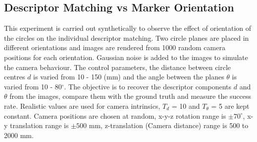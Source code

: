\documentclass{bmvc2k}
\begin{document}
\subsection{Descriptor Matching vs Marker Orientation}
This experiment is carried out synthetically to observe the effect of orientation of the circles on the individual descriptor matching.
Two circle planes are placed in different orientations and images are rendered from 1000 random camera positions for each orientation. Gaussian noise is added to the images to simulate the camera behaviour. 
The control parameters, the distance between circle centres $ d $ is varied from 10 - 150 (mm) and the angle between the planes $ \theta $ is varied from 10 - 80$ ^\circ $. 
The objective is to recover the descriptor components $ d $ and $ \theta $ from the images, compare them with the ground truth and measure the success rate. 
Realistic values are used for camera intrinsics, $ T_{d} $ = 10 and $ T_\theta $ = 5 are kept constant. 
Camera positions are chosen at random, x-y-z rotation range is $ \pm 70^\circ $, x-y translation range is $ \pm 500 $ mm, z-translation (Camera distance) range is 500 to 2000 mm. 

\end{document}
